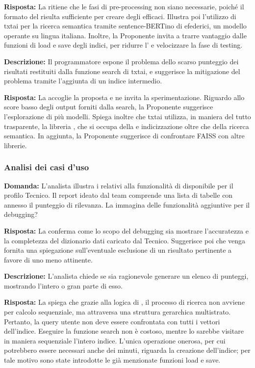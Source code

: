 \textbf{Risposta:} La  ritiene che le fasi di pre-processing non siano necessarie, poiché il formato del  risulta sufficiente per creare degli  efficaci.
Illustra poi l'utilizzo di txtai per la ricerca semantica tramite sentence-BERTino di efederici, un modello operante su lingua italiana. Inoltre, la Proponente invita a trarre vantaggio dalle funzioni di load e save degli indici, per ridurre l' e velocizzare la fase di testing.

\textbf{Descrizione:} Il programmatore espone il problema dello scarso punteggio dei risultati restituiti dalla funzione search di txtai, e suggerisce la mitigazione del problema tramite l'aggiunta di un indice intermedio. 

\textbf{Risposta:} La  accoglie la proposta e ne invita la sperimentazione. 
Riguardo allo score basso degli output forniti dalla search, la Proponente suggerisce l'esplorazione di più modelli. 
Spiega inoltre che txtai utilizza, in maniera del tutto trasparente, la libreria , che si occupa della  e indicizzazione oltre che della ricerca semantica. In aggiunta, la Proponente suggerisce di confrontare FAISS con altre librerie.

\subsubsection{Analisi dei casi d'uso}

\textbf{Domanda:} L'analista illustra i  relativi alla funzionalità di  disponibile per il profilo Tecnico. Il report ideato dal team comprende una lista di tabelle con annesso il punteggio di rilevanza. 
La  immagina delle funzionalità aggiuntive per il debugging?

\textbf{Risposta:} La  conferma come lo scopo del debugging sia mostrare l'accuratezza e la completezza del dizionario dati caricato dal Tecnico. 
Suggerisce poi che venga fornita una spiegazione sull'eventuale esclusione di un risultato pertinente a favore di uno meno attinente.

\textbf{Descrizione:} L'analista chiede se sia ragionevole generare un elenco di punteggi, mostrando l'intero  o gran parte di esso.

\textbf{Risposta:} La  spiega che grazie alla logica di , il processo di ricerca non avviene per calcolo sequenziale, ma attraversa una struttura gerarchica multistrato. Pertanto, la query utente non deve essere confrontata con tutti i vettori dell'indice. 
Eseguire la funzione search non è costoso, mentre lo sarebbe visitare in maniera sequenziale l'intero indice. 
L'unica operazione onerosa, per cui potrebbero essere necessari anche dei minuti, riguarda la creazione dell'indice; per tale motivo sono state introdotte le già menzionate funzioni load e save.

